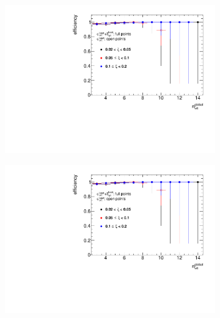 \begin{figure}[b!]
	\centering
	\begin{subfigure}{.49\textwidth}
		\includegraphics[width=\textwidth,page=3]{chapters/chrgSTAR/img/vertex/vertexEffi_ksi_noFake.pdf}
	\end{subfigure}
	\begin{subfigure}{.49\textwidth}
		\includegraphics[width=\textwidth,page=4]{chapters/chrgSTAR/img/vertex/vertexEffi_ksi_noFake.pdf}
	\end{subfigure}
	\begin{subfigure}{.49\textwidth}

\end{subfigure}
\end{figure}
